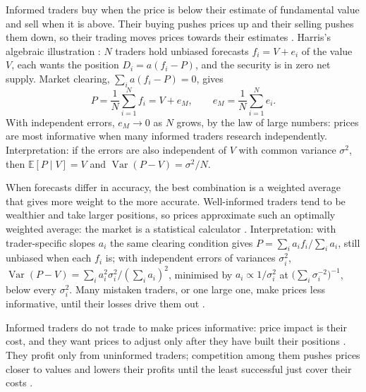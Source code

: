 \begin{qfresult}\label{res:informed-trading-aggregation}
 Informed traders buy when the price is below their estimate of fundamental value and sell when it is above. Their buying pushes prices up and their selling pushes them down, so their trading moves prices towards their estimates \citep[chap.~``Informed Traders and Market Efficiency'', secs.~10.2--10.3, pp.~223--224]{alpha-harris}. Harris's algebraic illustration \citep[same chap., box, p.~225]{alpha-harris}: $N$ traders hold unbiased forecasts $f_i=V+e_i$ of the value $V$, each wants the position $D_i=a(f_i-P)$, and the security is in zero net supply. Market clearing, $\sum_ia(f_i-P)=0$, gives
\[ P=\frac1N\sum_{i=1}^Nf_i=V+e_M, \qquad e_M=\frac1N\sum_{i=1}^Ne_i. \]
With independent errors, $e_M\to0$ as $N$ grows, by the law of large numbers: prices are most informative when many informed traders research independently. Interpretation: if the errors are also independent of $V$ with common variance $\sigma^2$, then $\mathbb{E}[P\mid V]=V$ and $\operatorname{Var}(P-V)=\sigma^2/N$.

 When forecasts differ in accuracy, the best combination is a weighted average that gives more weight to the more accurate. Well-informed traders tend to be wealthier and take larger positions, so prices approximate such an optimally weighted average: the market is a statistical calculator \citep[same chap., p.~224 and box, p.~226]{alpha-harris}. Interpretation: with trader-specific slopes $a_i$ the same clearing condition gives $P=\sum_ia_if_i/\sum_ia_i$, still unbiased when each $f_i$ is; with independent errors of variances $\sigma_i^2$, $\operatorname{Var}(P-V)=\sum_ia_i^2\sigma_i^2/(\sum_ia_i)^2$, minimised by $a_i\propto1/\sigma_i^2$ at $\bigl(\sum_i\sigma_i^{-2}\bigr)^{-1}$, below every $\sigma_i^2$. Many mistaken traders, or one large one, make prices less informative, until their losses drive them out \citep[same chap., p.~224]{alpha-harris}.

Informed traders do not trade to make prices informative: price impact is their cost, and they want prices to adjust only after they have built their positions \citep[same chap., p.~224]{alpha-harris}. They profit only from uninformed traders; competition among them pushes prices closer to values and lowers their profits until the least successful just cover their costs \citep[same chap., secs.~10.6.3 and~10.6.5, pp.~237--239]{alpha-harris}.


\end{qfresult}
